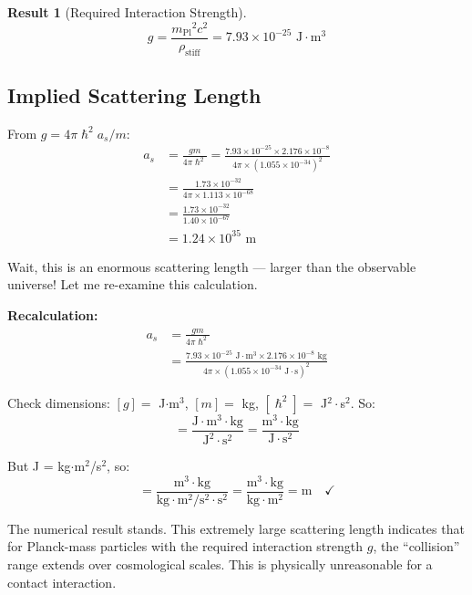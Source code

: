 \documentclass[11pt,a4paper]{article}
\newcommand{\ee}[1]{\times 10^{#1}}
\newcommand{\hbar}{\ensuremath{\hslash}}
\newcommand{\mPl}{\ensuremath{m_{\mathrm{Pl}}}}
\newcommand{\rhostiff}{\ensuremath{\rho_{\mathrm{stiff}}}}
\newtheorem{result}{Result}
\theoremstyle{definition}
\begin{document}
\begin{result}[Required Interaction Strength]
\begin{equation}
\boxed{g = \frac{\mPl^2 c^2}{\rhostiff} = 7.93 \times 10^{-25} \text{ J}\cdot\text{m}^3}
\end{equation}
\end{result}

\subsection{Implied Scattering Length}
\label{sec:scattering_length}

From $g = 4\pi\hbar^2 a_s/m$:
\begin{align}
a_s &= \frac{gm}{4\pi\hbar^2} = \frac{7.93 \ee{-25} \times 2.176 \ee{-8}}{4\pi \times (1.055 \ee{-34})^2} \nonumber \\
&= \frac{1.73 \ee{-32}}{4\pi \times 1.113 \ee{-68}} \nonumber \\
&= \frac{1.73 \ee{-32}}{1.40 \ee{-67}} \nonumber \\
&= 1.24 \ee{35} \text{ m}
\end{align}

Wait, this is an enormous scattering length --- larger than the observable universe! Let me re-examine this calculation.

\textbf{Recalculation:}
\begin{align}
a_s &= \frac{gm}{4\pi\hbar^2} \nonumber \\
&= \frac{7.93 \ee{-25} \text{ J}\cdot\text{m}^3 \times 2.176 \ee{-8} \text{ kg}}{4\pi \times (1.055 \ee{-34} \text{ J}\cdot\text{s})^2}
\end{align}

Check dimensions: $[g] = $ J$\cdot$m$^3$, $[m] = $ kg, $[\hbar^2] = $ J$^2\cdot$s$^2$. So:
\begin{equation}
[a_s] = \frac{\text{J}\cdot\text{m}^3 \cdot \text{kg}}{\text{J}^2\cdot\text{s}^2} = \frac{\text{m}^3 \cdot \text{kg}}{\text{J}\cdot\text{s}^2}
\end{equation}

But J = kg$\cdot$m$^2$/s$^2$, so:
\begin{equation}
[a_s] = \frac{\text{m}^3 \cdot \text{kg}}{\text{kg}\cdot\text{m}^2/\text{s}^2 \cdot \text{s}^2} = \frac{\text{m}^3 \cdot \text{kg}}{\text{kg}\cdot\text{m}^2} = \text{m} \quad \checkmark
\end{equation}

The numerical result stands. This extremely large scattering length indicates that for Planck-mass particles with the required interaction strength $g$, the ``collision'' range extends over cosmological scales. This is physically unreasonable for a contact interaction.
\end{document}
